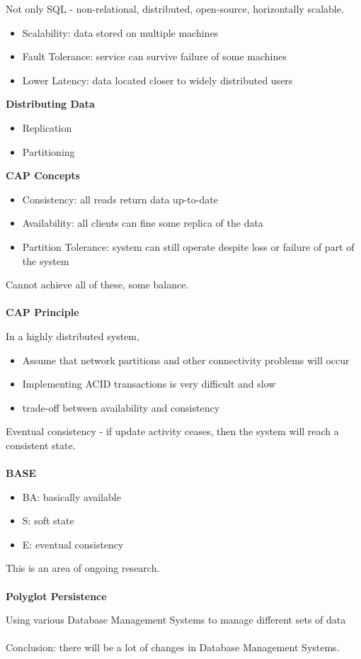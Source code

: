 \documentclass[12pt,a4paper]{article} %
\begin{document}
Not only SQL - non-relational, distributed, open-source, horizontally scalable.
	\begin{itemize}
	\item Scalability: data stored on multiple machines
	\item Fault Tolerance: service can survive failure of some machines
	\item Lower Latency: data located closer to widely distributed users
	\end{itemize}
\textbf{Distributing Data}
	\begin{itemize}
	\item Replication
	\item Partitioning
	\end{itemize}
\textbf{CAP Concepts}
	\begin{itemize}
	\item Consistency: all reads return data up-to-date
	\item Availability: all clients can fine some replica of the data
	\item Partition Tolerance: system can still operate despite loss or failure of part of the system
	\end{itemize}
Cannot achieve all of these, some balance.
\\\\
\textbf{CAP Principle}

In a highly distributed system, 
	\begin{itemize}
	\item Assume that network partitions and other connectivity problems will occur
	\item Implementing ACID transactions is very difficult and slow
	\item trade-off between availability and consistency
	\end{itemize}
Eventual consistency - if update activity ceases, then the system will reach a consistent state.
\\\\
\textbf{BASE}
	\begin{itemize}
	\item BA: basically available
	\item S: soft state
	\item E: eventual consistency
	\end{itemize}
This is an area of ongoing research.
\\\\
\textbf{Polyglot Persistence}

Using various Database Management Systems to manage different sets of data
\\\\
Conclusion: there will be a lot of changes in Database Management Systems.
\end{document}

